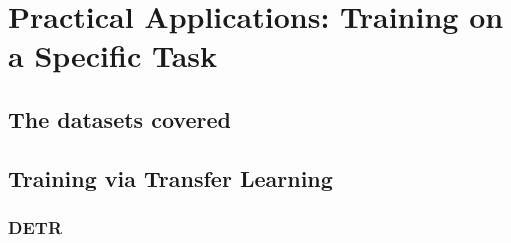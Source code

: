 \chapter{Practical Applications: Training on a Specific Task}

\section{The datasets covered}

\section{Training via Transfer Learning}

\subsection{DETR}
